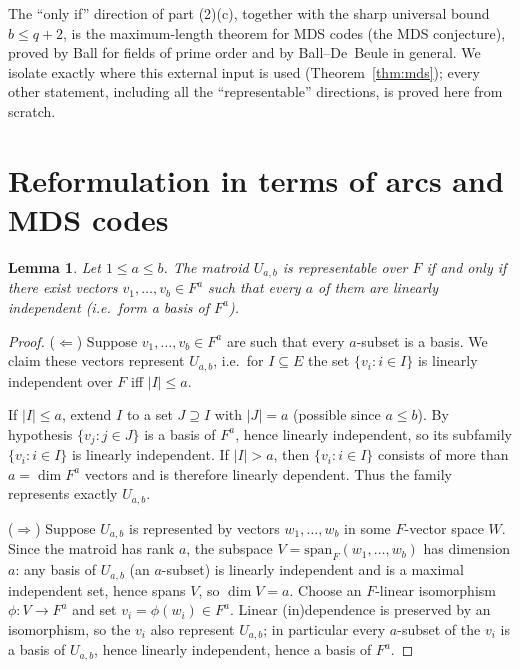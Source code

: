 \documentclass{amsart}
\newtheorem{lemma}{Lemma}
\theoremstyle{definition}
\begin{document}
The ``only if'' direction of part (2)(c), together with the sharp universal bound
$b\le q+2$, is the maximum-length theorem for MDS codes (the MDS conjecture),
proved by Ball for fields of prime order and by Ball--De~Beule in general. We
isolate exactly where this external input is used (Theorem~\ref{thm:mds}); every
other statement, including all the ``representable'' directions, is proved here
from scratch.

\section{Reformulation in terms of arcs and MDS codes}

\begin{lemma}\label{lem:reform}
Let $1\le a\le b$. The matroid $U_{a,b}$ is representable over $F$ if and only if
there exist vectors $v_1,\dots,v_b\in F^{a}$ such that every $a$ of them are
linearly independent (i.e.\ form a basis of $F^a$).
\end{lemma}

\begin{proof}
($\Leftarrow$) Suppose $v_1,\dots,v_b\in F^a$ are such that every $a$-subset is a
basis. We claim these vectors represent $U_{a,b}$, i.e.\ for $I\subseteq E$ the set
$\{v_i:i\in I\}$ is linearly independent over $F$ iff $|I|\le a$.

If $|I|\le a$, extend $I$ to a set $J\supseteq I$ with $|J|=a$ (possible since
$a\le b$). By hypothesis $\{v_j:j\in J\}$ is a basis of $F^a$, hence linearly
independent, so its subfamily $\{v_i:i\in I\}$ is linearly independent. If
$|I|>a$, then $\{v_i:i\in I\}$ consists of more than $a=\dim F^a$ vectors and is
therefore linearly dependent. Thus the family represents exactly $U_{a,b}$.

($\Rightarrow$) Suppose $U_{a,b}$ is represented by vectors $w_1,\dots,w_b$ in some
$F$-vector space $W$. Since the matroid has rank $a$, the subspace
$V=\mathrm{span}_F(w_1,\dots,w_b)$ has dimension $a$: any basis of $U_{a,b}$ (an
$a$-subset) is linearly independent and is a maximal independent set, hence spans
$V$, so $\dim V=a$. Choose an $F$-linear isomorphism $\phi:V\to F^a$ and set
$v_i=\phi(w_i)\in F^a$. Linear (in)dependence is preserved by an isomorphism, so
the $v_i$ also represent $U_{a,b}$; in particular every $a$-subset of the $v_i$ is
a basis of $U_{a,b}$, hence linearly independent, hence a basis of $F^a$.
\end{proof}
\end{document}
